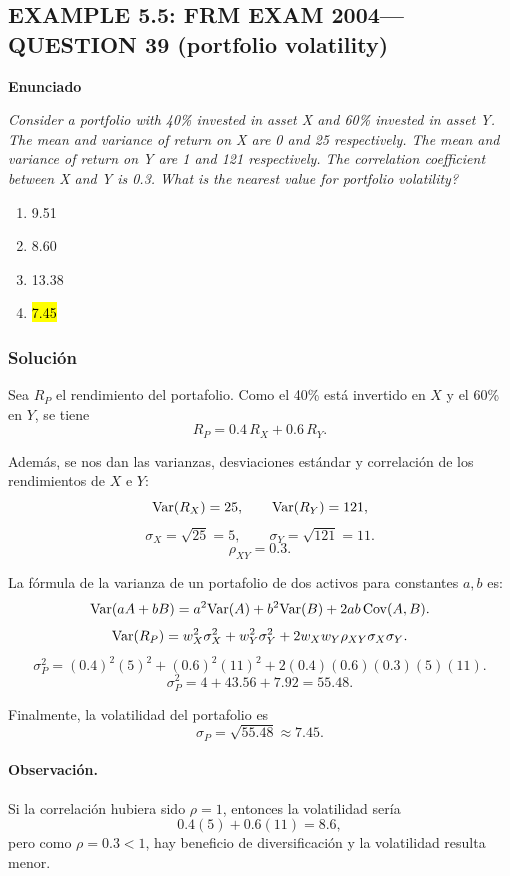 ﻿\subsection{EXAMPLE 5.5: FRM EXAM 2004---QUESTION 39 (portfolio volatility)}

\textbf{Enunciado}

\emph{Consider a portfolio with 40\% invested in asset X and 60\% invested in
asset Y. The mean and variance of return on X are 0 and 25
respectively. The mean and variance of return on Y are 1 and 121
respectively. The correlation coefficient between X and Y is 0.3. What is
the nearest value for portfolio volatility?}
\begin{enumerate}[label=\alph*.]
\item 9.51
\item 8.60
\item 13.38
\item \hl{7.45}
\end{enumerate}

\subsubsection*{Solución}

Sea \(R_P\) el rendimiento del portafolio. Como el 40\% está invertido en \(X\) y el 60\%
en \(Y\), se tiene
\[
R_P = 0.4\,R_X + 0.6\,R_Y.
\]

Además, se nos dan las varianzas, desviaciones estándar y correlación de los rendimientos de \(X\) e \(Y\):
\[
\mathrm{Var}(R_X)=25,\qquad \mathrm{Var}(R_Y)=121,
\]
\[
\sigma_X=\sqrt{25}=5,\qquad \sigma_Y=\sqrt{121}=11.
\]\[
\rho_{XY}=0.3.
\]

La fórmula de la varianza de un portafolio de dos activos para constantes \(a,b\) es:
\[
\mathrm{Var}(aA+bB)=a^2\mathrm{Var}(A)+b^2\mathrm{Var}(B)+2ab\,\mathrm{Cov}(A,B).
\]
\[
\mathrm{Var}(R_P)
=
w_X^2\sigma_X^2+w_Y^2\sigma_Y^2+2w_Xw_Y\rho_{XY}\sigma_X\sigma_Y.
\]
\[
\sigma_P^2
=
(0.4)^2(5)^2+(0.6)^2(11)^2+2(0.4)(0.6)(0.3)(5)(11).
\]
\[
\sigma_P^2=4+43.56+7.92=55.48.
\]

Finalmente, la volatilidad del portafolio es
\[
\sigma_P=\sqrt{55.48}\approx 7.45.
\]

\paragraph{Observación.}
Si la correlación hubiera sido \(\rho=1\), entonces la volatilidad sería
\[
0.4(5)+0.6(11)=8.6,
\]
pero como \(\rho=0.3<1\), hay beneficio de diversificación y la volatilidad
resulta menor.








